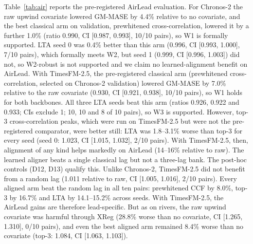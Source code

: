 \documentclass[preprint,11pt,authoryear]{elsarticle}
\newcommand{\lta}{\textsc{LTA}}
\begin{document}
Table~\ref{tab:air} reports the pre-registered AirLead evaluation. For Chronos-2 the raw upwind covariate lowered GM-MASE by 4.4\% relative to no covariate, and the best classical arm on validation, prewhitened cross-correlation, lowered it by a further 1.0\% (ratio 0.990, CI [0.987, 0.993], 10/10 pairs), so W1 is formally supported. \lta{} seed 0 was 0.4\% better than this arm (0.996, CI [0.993, 1.000], 7/10 pairs), which formally meets W2, but seed 1 (0.999, CI [0.996, 1.003]) did not, so W2-robust is not supported and we claim no learned-alignment benefit on AirLead. With TimesFM-2.5, the pre-registered classical arm (prewhitened cross-correlation, selected on Chronos-2 validation) lowered GM-MASE by 7.0\% relative to the raw covariate (0.930, CI [0.921, 0.938], 10/10 pairs), so W1 holds for both backbones. All three \lta{} seeds beat this arm (ratios 0.926, 0.922 and 0.933; CIs exclude 1; 10, 10 and 8 of 10 pairs), so W3 is supported. However, top-3 cross-correlation peaks, which were run on TimesFM-2.5 but were not the pre-registered comparator, were better still: \lta{} was 1.8--3.1\% worse than top-3 for every seed (seed 0: 1.023, CI [1.015, 1.032], 2/10 pairs). With TimesFM-2.5, then, alignment of any kind helps markedly on AirLead (14--16\% relative to raw). The learned aligner beats a single classical lag but not a three-lag bank. The post-hoc controls (D12, D13) qualify this. Unlike Chronos-2, TimesFM-2.5 did not benefit from a random lag (1.011 relative to raw, CI [1.005, 1.016], 2/10 pairs). Every aligned arm beat the random lag in all ten pairs: prewhitened CCF by 8.0\%, top-3 by 16.7\% and \lta{} by 14.1--15.2\% across seeds. With TimesFM-2.5, the AirLead gains are therefore lead-specific. But as on rivers, the raw upwind covariate was harmful through XReg (28.8\% worse than no covariate, CI [1.265, 1.310], 0/10 pairs), and even the best aligned arm remained 8.4\% worse than no covariate (top-3: 1.084, CI [1.063, 1.103]).
\end{document}
